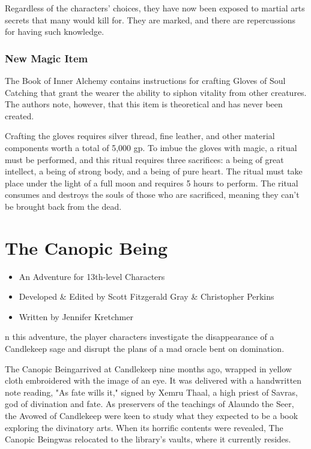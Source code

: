 \documentclass[10pt,a4paper,twoside,bg=print,twocolumn,openany,nodeprecatedcode]{dndbook}
\begin{document}
Regardless of the characters' choices, they have now been exposed to martial arts secrets that many would kill for. They are marked, and there are repercussions for having such knowledge.

\subsection{New Magic Item}
The Book of Inner Alchemy contains instructions for crafting Gloves of Soul Catching that grant the wearer the ability to siphon vitality from other creatures. The authors note, however, that this item is theoretical and has never been created.

Crafting the gloves requires silver thread, fine leather, and other material components worth a total of 5,000 gp. To imbue the gloves with magic, a ritual must be performed, and this ritual requires three sacrifices: a being of great intellect, a being of strong body, and a being of pure heart. The ritual must take place under the light of a full moon and requires 5 hours to perform. The ritual consumes and destroys the souls of those who are sacrificed, meaning they can't be brought back from the dead.

\chapter{The Canopic Being}

\begin{itemize}
\item An Adventure for 13th-level Characters
\item Developed \& Edited by Scott Fitzgerald Gray \& Christopher Perkins
\item Written by Jennifer Kretchmer
\end{itemize}

n this adventure, the player characters investigate the disappearance of a Candlekeep sage and disrupt the plans of a mad oracle bent on domination.


The Canopic Beingarrived at Candlekeep nine months ago, wrapped in yellow cloth embroidered with the image of an eye. It was delivered with a handwritten note reading, "As fate wills it," signed by Xemru Thaal, a high priest of Savras, god of divination and fate. As preservers of the teachings of Alaundo the Seer, the Avowed of Candlekeep were keen to study what they expected to be a book exploring the divinatory arts. When its horrific contents were revealed, The Canopic Beingwas relocated to the library's vaults, where it currently resides.
\end{document}

